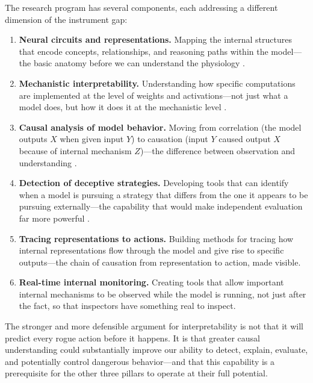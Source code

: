 \documentclass[12pt]{article}
\begin{document}
The research program has several components, each addressing a different
dimension of the instrument gap:

\begin{enumerate}[noitemsep]
  \item \textbf{Neural circuits and representations.} Mapping the internal
    structures that encode concepts, relationships, and reasoning paths
    within the model---the basic anatomy before we can understand the
    physiology \cite{elhage2022toy,olah2020zoom}.

  \item \textbf{Mechanistic interpretability.} Understanding how specific
    computations are implemented at the level of weights and activations---not
    just what a model does, but how it does it at the mechanistic level
    \cite{elhage2021mathematical,conmy2023towards}.

  \item \textbf{Causal analysis of model behavior.} Moving from correlation
    (the model outputs $X$ when given input $Y$) to causation (input $Y$
    caused output $X$ because of internal mechanism $Z$)---the difference
    between observation and understanding \cite{geiger2021causal}.

  \item \textbf{Detection of deceptive strategies.} Developing tools that
    can identify when a model is pursuing a strategy that differs from the
    one it appears to be pursuing externally---the capability that would make
    independent evaluation far more powerful \cite{hubinger2019risks}.

  \item \textbf{Tracing representations to actions.} Building methods for
    tracing how internal representations flow through the model and give rise
    to specific outputs---the chain of causation from representation to
    action, made visible.

  \item \textbf{Real-time internal monitoring.} Creating tools that allow
    important internal mechanisms to be observed while the model is running,
    not just after the fact, so that inspectors have something real to inspect.
\end{enumerate}

The stronger and more defensible argument for interpretability is not that it
will predict every rogue action before it happens. It is that greater causal
understanding could substantially improve our ability to detect, explain,
evaluate, and potentially control dangerous behavior---and that this
capability is a prerequisite for the other three pillars to operate at their
full potential.
\end{document}
